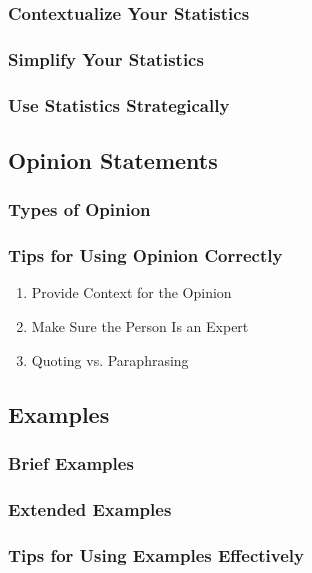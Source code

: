 \documentclass{report}
\begin{document}
            \subsubsection{Contextualize Your Statistics}
            \subsubsection{Simplify Your Statistics}
            \subsubsection{Use Statistics Strategically}
        
            \subsection{Opinion Statements}
            \subsubsection{Types of Opinion}
            \subsubsection{Tips for Using Opinion Correctly}
            \begin{enumerate}
                \item Provide Context for the Opinion
                \item Make Sure the Person Is an Expert
                \item Quoting vs. Paraphrasing
            \end{enumerate}
        
        \subsection{Examples}
            \subsubsection{Brief Examples}
            \subsubsection{Extended Examples}
            \subsubsection{Tips for Using Examples Effectively}
\end{document}
